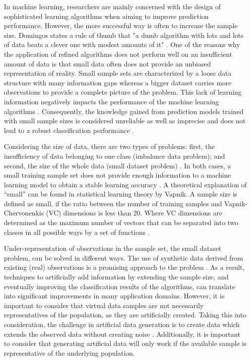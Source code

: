 \documentclass[parskip=full]{scrartcl}
\begin{document}
In machine learning, researchers are mainly concerned with the design of 
sophisticated learning algorithms when aiming to improve prediction 
performance. However, the more successful way is often to increase the sample 
size. Domingos states a rule of thumb that "a dumb algorithm with lots and lots 
of data beats a clever one with modest amounts of it" \cite{Domingos.2012}. One 
of the reasons why the application of refined algorithms does not perform well 
on an insufficient amount of data is that small data often does not provide an 
unbiased representation of reality. Small sample sets are characterized by a 
loose data structure with many information gaps whereas a bigger dataset 
carries more observations to provide a complete picture of the problem. This 
lack of learning information negatively impacts the performance of the machine 
learning algorithms \cite{Lin.2018}. Consequently, the knowledge gained from 
prediction models trained with small sample sizes is considered unreliable as 
well as imprecise and does not lead to a robust classification performance 
\cite{AbdulLateh.2017}.

Considering the size of data, there are two types of problems: first, the 
insufficiency of data belonging to one class (imbalance data problem); and 
second, the size of the whole data (small dataset problem) \cite{Sezer.2014}. 
In both cases, a small training sample set does not provide enough information 
to a machine learning model to obtain a stable learning accuracy 
\cite{Tsai.2008}. A theoretical explanation of “small” can be found in 
statistical learning theory by Vapnik. A sample size is defined as small, if 
the ratio between the number of training samples and Vapnik-Chervonenkis (VC) 
dimensions is less than 20. Where VC dimensions are determined as the maximum 
number of vectors that can be separated into two classes in all possible ways 
by a set of functions \cite{Vapnik.2008}. 

Under-representation of observations in the sample set, the small dataset 
problem, can be solved in different ways. The use of synthetic data derived 
from existing (real) observations is a promising approach to the problem 
\cite{Sezer.2014}. As a result, techniques to artificially add information by 
extending the sample size, and eventually improving the classification results 
of the algorithms, can translate into significant improvements in many 
application domains. However, it is important to consider that virtual data 
samples are not necessarily representatives of the population, as they are 
artificially created. Taking this into consideration, the challenge in 
artificial data generation is to create data which extends the observed data 
without creating noise \cite{Li.2006}. Additionally, it is important to 
consider that generating artificial data will only work if the available sample 
is representative of the underlying population.
\end{document}
